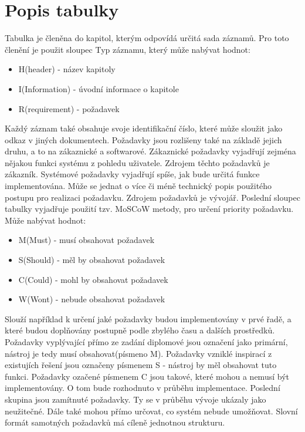 \section{Popis tabulky}
Tabulka je členěna do kapitol, kterým odpovídá určitá sada záznamů. Pro toto členění je použit sloupec Typ záznamu, který může nabývat hodnot:
    \begin{itemize}
    \item H(header) - název kapitoly
	\item I(Information) - úvodní informace o kapitole
    \item R(requirement) - požadavek
\end{itemize}
Každý záznam také obsahuje svoje identifikační číslo, které může sloužit jako odkaz v jiných dokumentech. Požadavky jsou rozlišeny také na základě jejich druhu, a to na zákaznické a softwarové. Zákaznické požadavky vyjadřují zejména nějakou funkci systému z pohledu uživatele. Zdrojem těchto požadavků je zákazník. Systémové požadavky vyjadřují spíše, jak bude určitá funkce implementována. Může se jednat o více či méně technický popis použitého postupu pro realizaci požadavku. Zdrojem požadavků je vývojář. Poslední sloupec tabulky vyjadřuje použití tzv. MoSCoW metody, pro určení priority požadavku. \cite{moscow} Může nabývat hodnot:
    \begin{itemize}
    \item M(Must) - musí obsahovat požadavek
	\item S(Should) - měl by obsahovat požadavek
    \item  C(Could) - mohl by obsahovat požadavek
    \item  W(Wont) - nebude obsahovat požadavek
    
\end{itemize}
Slouží například k určení jaké požadavky budou implementovány v prvé řadě, a které budou doplňovány postupně podle zbylého času a dalších prostředků. Požadavky vyplývající přímo ze zadání diplomové jsou označení jako primární, nástroj je tedy musí obsahovat(písmeno M). Požadavky vzniklé  inspirací z existujích řešení jsou označeny písmenem S - nástroj by měl obsahovat tuto funkci. Požadavky ozačené písmenem C jsou takové, které mohou a nemusí být implementovány. O tom bude rozhodnuto v průběhu implementace. Poslední skupina jsou zamítnuté požadavky. Ty se v průběhu vývoje ukázaly jako neužitečné. Dále také mohou přímo určovat, co systém nebude umožňovat. Slovní formát samotných požadavků má cíleně jednotnou strukturu.  

